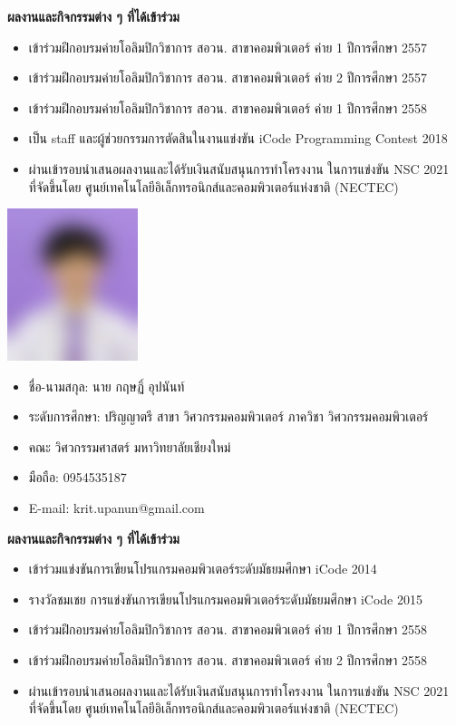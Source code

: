 \documentclass[semifinal]{cpecmu}
\begin{document}
\begin{biosketch}
\noindent \textbf{ผลงานและกิจกรรมต่าง ๆ ที่ได้เข้าร่วม}
\begin{itemize}
  \item เข้าร่วมฝึกอบรมค่ายโอลิมปิกวิชาการ สอวน. สาขาคอมพิวเตอร์ ค่าย 1 ปีการศึกษา 2557
  \item เข้าร่วมฝึกอบรมค่ายโอลิมปิกวิชาการ สอวน. สาขาคอมพิวเตอร์ ค่าย 2 ปีการศึกษา 2557
  \item เข้าร่วมฝึกอบรมค่ายโอลิมปิกวิชาการ สอวน. สาขาคอมพิวเตอร์ ค่าย 1 ปีการศึกษา 2558
  \item เป็น staff และผู้ช่วยกรรมการตัดสินในงานแข่งขัน iCode Programming Contest 2018
  \item ผ่านเข้ารอบนำเสนอผลงานและได้รับเงินสนับสนุนการทำโครงงาน ในการแข่งขัน NSC 2021\\
  ที่จัดขึ้นโดย ศูนย์เทคโนโลยีอิเล็กทรอนิกส์และคอมพิวเตอร์แห่งชาติ (NECTEC)
\end{itemize}
\newpage
\begin{center}
  \includegraphics[width=1.5in]{mugshot.jpg}
\end{center}
\begin{itemize}[label={},leftmargin=*]
  \item ชื่อ-นามสกุล: นาย กฤษฏิ์ อุปนันท์
  \item ระดับการศึกษา: ปริญญาตรี สาขา วิศวกรรมคอมพิวเตอร์ ภาควิชา วิศวกรรมคอมพิวเตอร์
  \item คณะ วิศวกรรมศาสตร์ มหาวิทยาลัยเชียงใหม่
  \item มือถือ: 0954535187
  \item E-mail: krit.upanun@gmail.com
\end{itemize}


\noindent \textbf{ผลงานและกิจกรรมต่าง ๆ ที่ได้เข้าร่วม}
\begin{itemize}
  \item เข้าร่วมแข่งขันการเขียนโปรแกรมคอมพิวเตอร์ระดับมัธยมศึกษา iCode 2014
  \item รางวัลชมเชย การแข่งขันการเขียนโปรแกรมคอมพิวเตอร์ระดับมัธยมศึกษา iCode 2015
  \item เข้าร่วมฝึกอบรมค่ายโอลิมปิกวิชาการ สอวน. สาขาคอมพิวเตอร์ ค่าย 1 ปีการศึกษา 2558
  \item เข้าร่วมฝึกอบรมค่ายโอลิมปิกวิชาการ สอวน. สาขาคอมพิวเตอร์ ค่าย 2 ปีการศึกษา 2558
  \item ผ่านเข้ารอบนำเสนอผลงานและได้รับเงินสนับสนุนการทำโครงงาน ในการแข่งขัน NSC 2021\\
  ที่จัดขึ้นโดย ศูนย์เทคโนโลยีอิเล็กทรอนิกส์และคอมพิวเตอร์แห่งชาติ (NECTEC)
\end{itemize}

\end{biosketch}
\fi %
\end{document}
